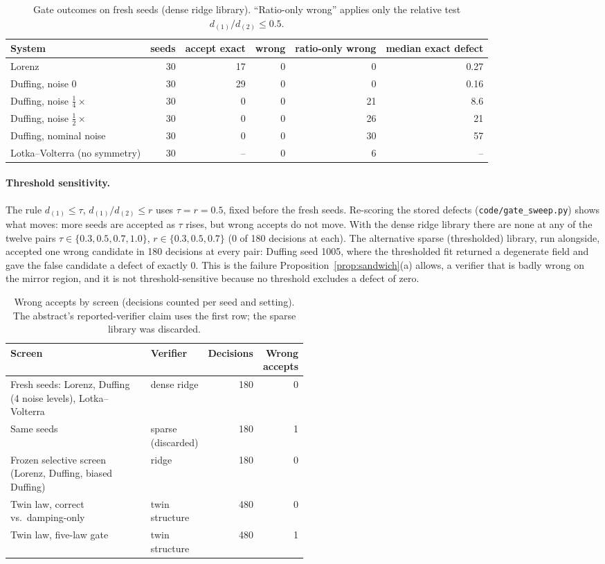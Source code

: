 \begin{table}[h]
\centering\small
\caption{Gate outcomes on fresh seeds (dense ridge library). ``Ratio-only wrong'' applies only the relative test $d_{(1)}/d_{(2)}\le0.5$.}
\label{tab:gate-fresh}
\setlength{\tabcolsep}{4pt}
\begin{tabular}{lrrrrr}
\toprule
System & seeds & accept exact & wrong & ratio-only wrong & median exact defect\\
\midrule
Lorenz & 30 & 17 & 0 & 0 & 0.27\\
Duffing, noise $0$ & 30 & 29 & 0 & 0 & 0.16\\
Duffing, noise $\tfrac14\times$ & 30 & 0 & 0 & 21 & 8.6\\
Duffing, noise $\tfrac12\times$ & 30 & 0 & 0 & 26 & 21\\
Duffing, nominal noise & 30 & 0 & 0 & 30 & 57\\
Lotka--Volterra (no symmetry) & 30 & -- & 0 & 6 & --\\
\bottomrule
\end{tabular}
\end{table}

\paragraph{Threshold sensitivity.} The rule $d_{(1)}\le\tau$, $d_{(1)}/d_{(2)}\le r$ uses $\tau=r=0.5$, fixed before the fresh seeds. Re-scoring the stored defects (\texttt{code/gate\_sweep.py}) shows what moves: more seeds are accepted as $\tau$ rises, but wrong accepts do not move. With the dense ridge library there are none at any of the twelve pairs $\tau\in\{0.3,0.5,0.7,1.0\}$, $r\in\{0.3,0.5,0.7\}$ (0 of 180 decisions at each). The alternative sparse (thresholded) library, run alongside, accepted one wrong candidate in 180 decisions at every pair: Duffing seed 1005, where the thresholded fit returned a degenerate field and gave the false candidate a defect of exactly $0$. This is the failure Proposition~\ref{prop:sandwich}(a) allows, a verifier that is badly wrong on the mirror region, and it is not threshold-sensitive because no threshold excludes a defect of zero.
\begin{table}[h]
\centering\small
\caption{Wrong accepts by screen (decisions counted per seed and setting). The abstract's reported-verifier claim uses the first row; the sparse library was discarded.}
\label{tab:wrong-accepts}
\begin{tabular}{@{}>{\raggedright\arraybackslash}p{0.5\linewidth}lrr@{}}
\toprule
Screen & Verifier & Decisions & Wrong accepts\\
\midrule
Fresh seeds: Lorenz, Duffing (4 noise levels), Lotka--Volterra & dense ridge & 180 & 0\\
Same seeds & sparse (discarded) & 180 & 1\\
Frozen selective screen (Lorenz, Duffing, biased Duffing) & ridge & 180 & 0\\
Twin law, correct vs.\ damping-only & twin structure & 480 & 0\\
Twin law, five-law gate & twin structure & 480 & 1\\
\bottomrule
\end{tabular}
\end{table}

